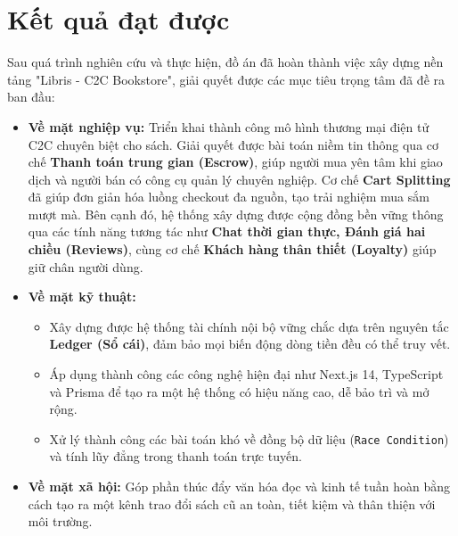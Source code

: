 \documentclass[../main.tex]{subfiles}
\begin{document}
\section{Kết quả đạt được}
Sau quá trình nghiên cứu và thực hiện, đồ án đã hoàn thành việc xây dựng nền tảng "Libris - C2C Bookstore", giải quyết được các mục tiêu trọng tâm đã đề ra ban đầu:

\begin{itemize}
    \item \textbf{Về mặt nghiệp vụ:} Triển khai thành công mô hình thương mại điện tử C2C chuyên biệt cho sách. Giải quyết được bài toán niềm tin thông qua cơ chế \textbf{Thanh toán trung gian (Escrow)}, giúp người mua yên tâm khi giao dịch và người bán có công cụ quản lý chuyên nghiệp. Cơ chế \textbf{Cart Splitting} đã giúp đơn giản hóa luồng checkout đa nguồn, tạo trải nghiệm mua sắm mượt mà. Bên cạnh đó, hệ thống xây dựng được cộng đồng bền vững thông qua các tính năng tương tác như \textbf{Chat thời gian thực, Đánh giá hai chiều (Reviews)}, cùng cơ chế \textbf{Khách hàng thân thiết (Loyalty)} giúp giữ chân người dùng.
    \item \textbf{Về mặt kỹ thuật:} 
    \begin{itemize}
        \item Xây dựng được hệ thống tài chính nội bộ vững chắc dựa trên nguyên tắc \textbf{Ledger (Sổ cái)}, đảm bảo mọi biến động dòng tiền đều có thể truy vết.
        \item Áp dụng thành công các công nghệ hiện đại như Next.js 14, TypeScript và Prisma để tạo ra một hệ thống có hiệu năng cao, dễ bảo trì và mở rộng.
        \item Xử lý thành công các bài toán khó về đồng bộ dữ liệu (\texttt{Race Condition}) và tính lũy đẳng trong thanh toán trực tuyến.
    \end{itemize}
    \item \textbf{Về mặt xã hội:} Góp phần thúc đẩy văn hóa đọc và kinh tế tuần hoàn bằng cách tạo ra một kênh trao đổi sách cũ an toàn, tiết kiệm và thân thiện với môi trường.
\end{itemize}
\end{document}
